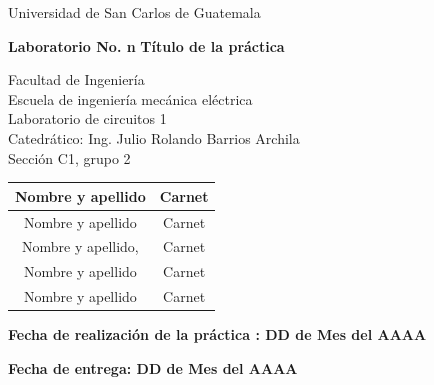 \documentclass[osajnl,showpacs,superscriptaddress,10pt]{article}
\begin{document}
\begin{center}
\begin{Large}
Universidad de San Carlos de Guatemala
\end{Large}
\end{center}



\begin{center}
\begin{Huge}
\textbf{Laboratorio No. n}
\textbf{Título de la práctica}
\end{Huge}
\end{center}



\begin{center}
\begin{normalsize}
Facultad de Ingeniería\\
Escuela de ingeniería mecánica eléctrica\\
Laboratorio de circuitos 1\\
Catedrático: Ing. Julio Rolando Barrios Archila\\
Sección C1, grupo 2\\
\end{normalsize}
\end{center}


\begin{table}[H]
\begin{center}
\begin{tabular}{c c}
\hline 
Nombre y apellido & Carnet \\ 
\hline 
Nombre y apellido & Carnet \\ 
\hline 
Nombre y apellido, &  Carnet \\ 
\hline 
Nombre y apellido & Carnet \\ 
\hline 
Nombre y apellido & Carnet \\ 
\hline 
\end{tabular} 
\end{center}
\end{table}



\begin{center}
\textbf{Fecha de realización de la práctica : DD de Mes del AAAA}
\end{center}
\begin{center}
\textbf{Fecha de entrega: DD de Mes del AAAA}
\end{center}




\clearpage
\end{document}
